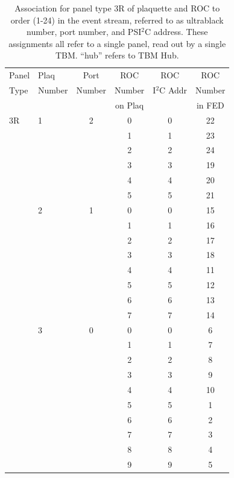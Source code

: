 \documentclass{cmspaper}
\begin{document}
\begin{appendix}
\begin{table}[htb]
    \caption{
Association for panel type 3R of plaquette and ROC to order
(1-24)  in the event stream, referred to as ultrablack number, port number, 
and PSI$^{2}$C address. These assignments all refer to a single panel, read 
out by a single TBM. ``hub'' refers to TBM Hub.
}
    \label{table:plaq_fed_3R}
    \begin{center}
      \begin{tabular}{l|l|cccc} \hline
Panel & Plaq & Port & ROC & ROC & ROC \\
Type  & Number & Number & Number & I$^2$C Addr & Number \\
      &        &        & on Plaq &            & in FED \\ \hline
3R & 1 & 2 &  0 & 0 & 22 \\
   &   &   &  1 & 1 & 23 \\
   &   &   &  2 & 2 & 24 \\
   &   &   &  3 & 3 & 19 \\
   &   &   &  4 & 4 & 20 \\
   &   &   &  5 & 5 & 21 \\
   & 2 & 1 &  0 & 0 & 15 \\
   &   &   &  1 & 1 & 16 \\
   &   &   &  2 & 2 & 17 \\
   &   &   &  3 & 3 & 18 \\
   &   &   &  4 & 4 & 11 \\
   &   &   &  5 & 5 & 12 \\
   &   &   &  6 & 6 & 13 \\
   &   &   &  7 & 7 & 14 \\
   & 3 & 0 &  0 & 0 &  6 \\
   &   &   &  1 & 1 &  7 \\
   &   &   &  2 & 2 &  8 \\
   &   &   &  3 & 3 &  9 \\
   &   &   &  4 & 4 & 10 \\
   &   &   &  5 & 5 &  1 \\
   &   &   &  6 & 6 &  2 \\
   &   &   &  7 & 7 &  3 \\
   &   &   &  8 & 8 &  4 \\
   &   &   &  9 & 9 &  5 \\
      \end{tabular}
    \end{center}
  \end{table}



\end{appendix}
\end{document}
